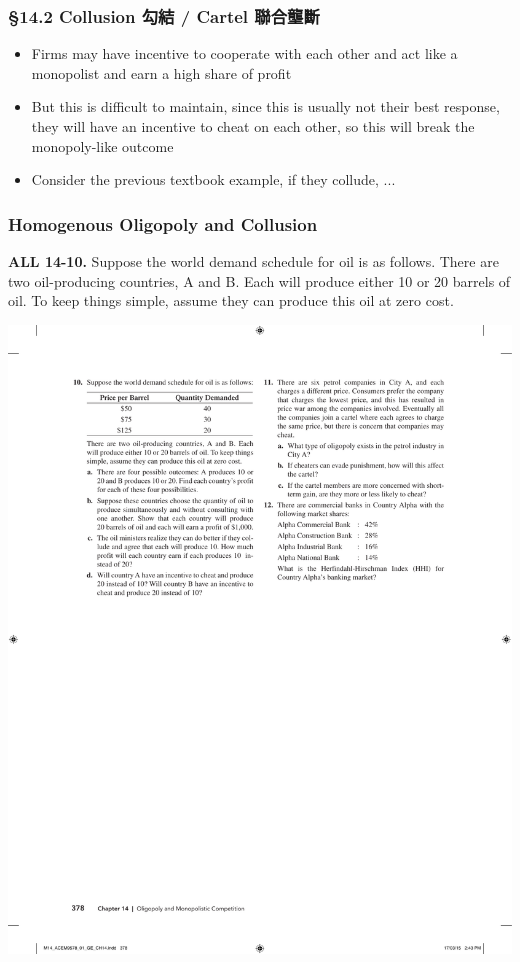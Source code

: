 \documentclass[12pt, xcolor=dvipsnames]{beamer}
\begin{document}
\begin{frame}
\frametitle{\bf §14.2 Collusion 勾結 / Cartel 聯合壟斷}
\begin{itemize}
\item Firms may have incentive to cooperate with each other and act like a monopolist and earn a high share of profit
\item But this is difficult to maintain, since this is usually not their best response, they will have an incentive to cheat on each other, so this will break the monopoly-like outcome
\item Consider the previous textbook example, if they collude, ...
\end{itemize}
\end{frame}



\begin{frame}
\frametitle{\bf Homogenous Oligopoly and Collusion}
\small \textsf{\bfseries ALL 14-10.} Suppose the world demand schedule for oil is as follows. There are two oil-producing countries, A and B. Each will produce either 10 or 20 barrels of oil. To keep things simple, assume they can produce this oil at zero cost.
\begin{center}
\includegraphics[width=.6\linewidth]{figures/p10.pdf}
\end{center}
\end{frame}
\end{document}
